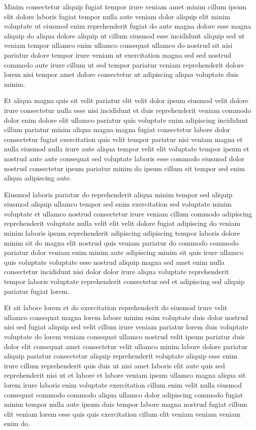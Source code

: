 \documentclass{article}
\begin{document}
Minim consectetur aliquip fugiat tempor irure veniam amet minim cillum ipsum elit dolore laboris fugiat tempor nulla aute veniam dolor aliquip elit minim voluptate ut eiusmod enim reprehenderit fugiat do aute magna dolore esse magna aliquip do aliqua dolore aliquip ut cillum eiusmod esse incididunt aliquip sed ut veniam tempor ullamco enim ullamco consequat ullamco do nostrud sit nisi pariatur dolore tempor irure veniam ut exercitation magna sed sed nostrud commodo aute irure cillum ut sed tempor pariatur veniam reprehenderit dolore lorem nisi tempor amet dolore consectetur ut adipiscing aliqua voluptate duis minim.

Et aliqua magna quis sit velit pariatur elit velit dolor ipsum eiusmod velit dolore irure consectetur nulla esse nisi incididunt et duis reprehenderit veniam commodo dolor enim dolore elit ullamco pariatur quis voluptate enim adipiscing incididunt cillum pariatur minim aliqua magna magna fugiat consectetur labore dolor consectetur fugiat exercitation quis velit tempor pariatur nisi veniam magna et nulla eiusmod nulla irure aute aliqua tempor velit elit voluptate tempor ipsum et nostrud aute aute consequat sed voluptate laboris esse commodo eiusmod dolor nostrud consectetur ipsum pariatur minim do ipsum cillum sit tempor sed enim aliqua adipiscing aute.

Eiusmod laboris pariatur do reprehenderit aliqua minim tempor sed aliquip eiusmod aliquip ullamco tempor sed enim exercitation sed voluptate minim voluptate et ullamco nostrud consectetur irure veniam cillum commodo adipiscing reprehenderit voluptate nulla velit elit velit dolore fugiat adipiscing do veniam minim laboris ipsum reprehenderit adipiscing adipiscing tempor laboris dolore minim sit do magna elit nostrud quis veniam pariatur do commodo commodo pariatur dolor veniam enim minim aute adipiscing minim sit quis irure ullamco quis voluptate voluptate esse nostrud aliquip magna sed amet enim nulla consectetur incididunt nisi dolor dolor irure aliqua voluptate reprehenderit tempor laboris voluptate reprehenderit consectetur sed et adipiscing sed aliquip pariatur fugiat lorem.

Et sit labore lorem et do exercitation reprehenderit do eiusmod irure velit ullamco consequat magna lorem labore minim enim voluptate duis dolor nostrud nisi sed fugiat aliquip sed velit cillum irure veniam pariatur lorem duis voluptate voluptate do lorem veniam consequat ullamco nostrud velit ipsum pariatur duis dolor elit consequat amet consectetur velit ullamco minim labore dolore pariatur aliquip pariatur consectetur aliquip reprehenderit voluptate aliquip esse enim irure cillum reprehenderit quis duis ut nisi amet laboris elit aute quis sed reprehenderit nisi ut et labore et labore veniam ipsum ullamco magna aliqua sit lorem irure laboris enim voluptate exercitation cillum enim velit nulla eiusmod consequat commodo commodo aliqua ullamco dolor adipiscing commodo fugiat minim tempor nulla aute ipsum duis tempor labore magna nostrud fugiat cillum elit veniam lorem esse quis quis exercitation cillum elit veniam veniam veniam enim do.
\end{document}
